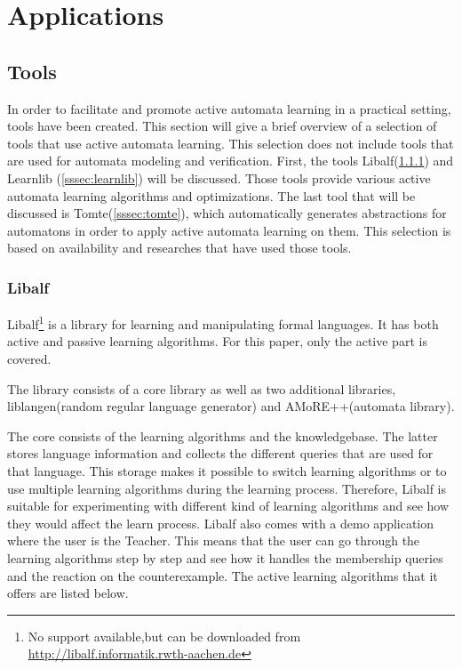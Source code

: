 \documentclass[multi,crop=false,class=article]{standalone}
\begin{document}
\section{Applications}
\label{sec:applications}

\subsection{Tools}
\label{ssec:tools}

In order to facilitate and promote active automata learning in a practical 
setting, tools have been created. This section will give a brief overview of a 
selection of tools that use active automata learning. This selection does not 
include tools that are used for automata modeling and verification. First, the 
tools Libalf(\ref{sssec:libalf}) and Learnlib (\ref{sssec:learnlib}) will be 
discussed. Those tools provide various active automata learning algorithms and 
optimizations. The last tool that will be discussed is 
Tomte(\ref{sssec:tomte}), which automatically generates abstractions for 
automatons in order to apply active automata learning on them. 
This selection is based on availability and researches that have used those 
tools.

\subsubsection{Libalf}
\label{sssec:libalf}
Libalf\footnote{No support available,but can be downloaded from 
	\url{http://libalf.informatik.rwth-aachen.de}} is a library for learning 
and manipulating formal languages. It has both active and passive learning 
algorithms. For this paper, only the active part is covered.

The library consists of a core library as well as two additional libraries, 
liblangen(random regular language generator) and AMoRE++(automata library).

The core consists of the learning algorithms and the knowledgebase. The latter 
stores language information and collects the different queries that are used 
for that language. This storage makes it possible to switch learning algorithms 
or to use multiple learning algorithms during the learning process. Therefore, 
Libalf is suitable for experimenting with different kind of learning algorithms 
and see how they would affect the learn process. Libalf also comes with a demo 
application where the user is the Teacher. This means that the user can go 
through the learning algorithms step by step and see how it handles the 
membership queries and the reaction on the counterexample. The active learning 
algorithms that it offers are listed below.
\end{document}
